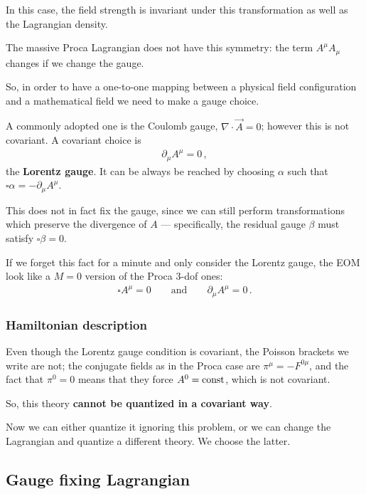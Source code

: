 \documentclass[main.tex]{subfiles}
\begin{document}
In this case, the field strength is invariant under this transformation as well as the Lagrangian density. 

The massive Proca Lagrangian does not have this symmetry: the term \(A^{\mu } A_{\mu }\) changes if we change the gauge. 

So, in order to have a one-to-one mapping between a physical field configuration and a mathematical field we need to make a gauge choice. 

A commonly adopted one is the Coulomb gauge, \(\nabla \cdot \vec{A} = 0\); however this is not covariant. A covariant choice is 
%
\begin{align}
\partial_{\mu } A^{\mu } = 0
\,,
\end{align}
%
the \textbf{Lorentz gauge}. It can be always be reached by choosing \(\alpha \) such that \(\square \alpha = - \partial_{\mu } A^{\mu }\). 

This does not in fact fix the gauge, since we can still perform transformations which preserve the divergence of \(A\) --- specifically, the residual gauge \(\beta \) must satisfy \(\square \beta = 0\). 

If we forget this fact for a minute and only consider the Lorentz gauge, the EOM look like a \(M=0\) version of the  Proca 3-dof ones: 
%
\begin{align}
\square A^{\mu } = 0 \qquad \text{and} \qquad \partial_{\mu } A^{\mu } = 0 
\,.
\end{align}

\subsubsection{Hamiltonian description}

Even though the Lorentz gauge condition is covariant, the Poisson brackets we write are not; the conjugate fields as in the Proca case are \(\pi^{\mu} = - F^{0\mu}\), and the fact that \(\pi^{0} = 0\) means that they force \(A^{0} = \text{const}\), which is not covariant. 

So, this theory \textbf{cannot be quantized in a covariant way}. 

Now we can either quantize it ignoring this problem, or we can change the Lagrangian and quantize a different theory. We choose the latter. 

\subsection{Gauge fixing Lagrangian}
\end{document}
